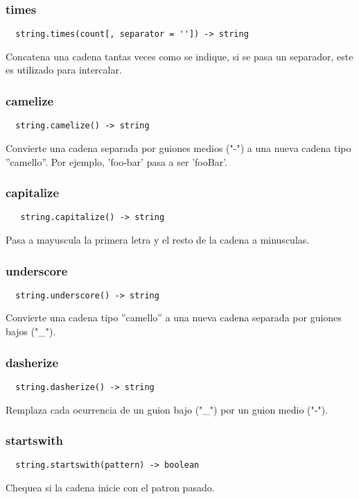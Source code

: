 \subsubsection*{times}
\begin{verbatim}
  string.times(count[, separator = '']) -> string
\end{verbatim}
Concatena una cadena tantas veces como se indique, si se pasa un separador, este es utilizado para intercalar.

\subsubsection*{camelize}
\begin{verbatim}
  string.camelize() -> string
\end{verbatim}
Convierte una cadena separada por guiones medios ("-") a una nueva cadena tipo ''camello''. Por ejemplo, 'foo-bar' pasa a ser 'fooBar'.

\subsubsection*{capitalize}
\begin{verbatim}
   string.capitalize() -> string
\end{verbatim}
Pasa a mayuscula la primera letra y el resto de la cadena a minusculas.

\subsubsection*{underscore}
\begin{verbatim}
  string.underscore() -> string
\end{verbatim}
Convierte una cadena tipo ''camello'' a una nueva cadena separada por guiones bajos ("_").

\subsubsection*{dasherize}
\begin{verbatim}
  string.dasherize() -> string
\end{verbatim}
Remplaza cada ocurrencia de un guion bajo ("_") por un guion medio ("-").

\subsubsection*{startswith}
\begin{verbatim}
  string.startswith(pattern) -> boolean
\end{verbatim}
Chequea si la cadena inicie con el patron pasado.

